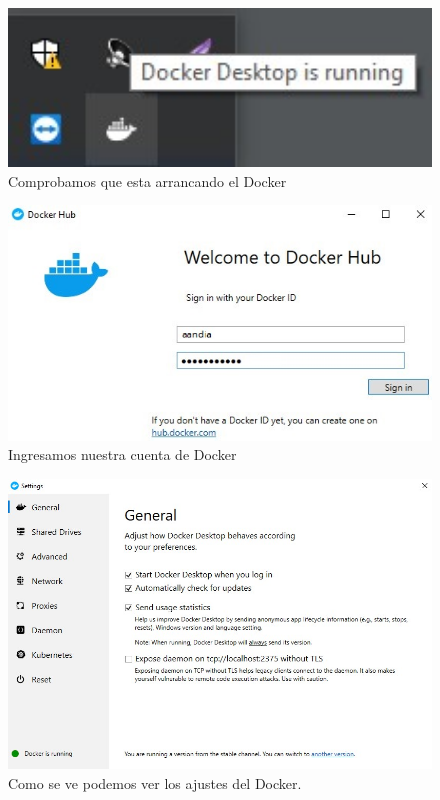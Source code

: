 \documentclass[preprint,12pt]{elsarticle}
\begin{document}
\begin{figure}[H]
	\begin{center}
		\includegraphics[width=12cm]{./IMAGENES/foto2} 
		\caption{Comprobamos que esta arrancando el Docker}
	\end{center}
\end{figure}

\begin{figure}[H]
	\begin{center}
		\includegraphics[width=12cm]{./IMAGENES/foto3} 
		\caption{Ingresamos nuestra cuenta de Docker}
	\end{center}
\end{figure}

\begin{figure}[H]
	\begin{center}
		\includegraphics[width=12cm]{./IMAGENES/foto4} 
		\caption{Como se ve podemos ver los ajustes del Docker.}
	\end{center}
\end{figure}
\end{document}
